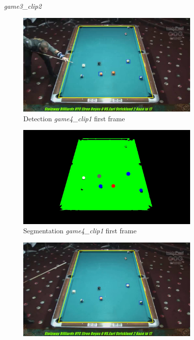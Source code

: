 \begin{figure}[H]
	\caption{\textit{game3\_clip2}}
\end{figure}

\begin{figure}[H]
	\centering
	\begin{subfigure}[b]{0.48\textwidth}
		\centering
		\includegraphics[width=\textwidth]{images/Detection/game4_clip1_detected_balls_first_frame.jpg}
		\caption{Detection \textit{game4\_clip1} first frame}
		\label{fig: game4_clip1_first_frame_detected}
	\end{subfigure}
	\begin{subfigure}[b]{0.48\textwidth}
		\centering
		\includegraphics[width=\textwidth]{images/Segmentation/game4_clip1_segmented_balls_first_frame.jpg}
		\caption{Segmentation \textit{game4\_clip1} first frame}
		\label{fig: game4_clip1_first_frame_segmented}
	\end{subfigure}
	\begin{subfigure}[b]{0.48\textwidth}
		\centering
		\includegraphics[width=\textwidth]{images/Detection/game4_clip1_detected_balls_last_frame.jpg}

\end{subfigure}
\end{figure}
